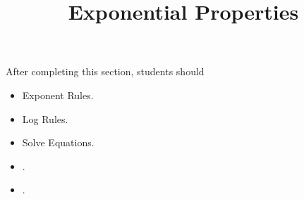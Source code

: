 \documentclass{ximera}
\title{Exponential Properties}
\begin{document}
\begin{abstract}
\end{abstract}
\maketitle

\begin{sectionOutcomes}
After completing this section, students should 

\begin{itemize}
\item Exponent Rules.
\item Log Rules.
\item Solve Equations.
\item .
\item .
\end{itemize}
\end{sectionOutcomes}
\end{document}
